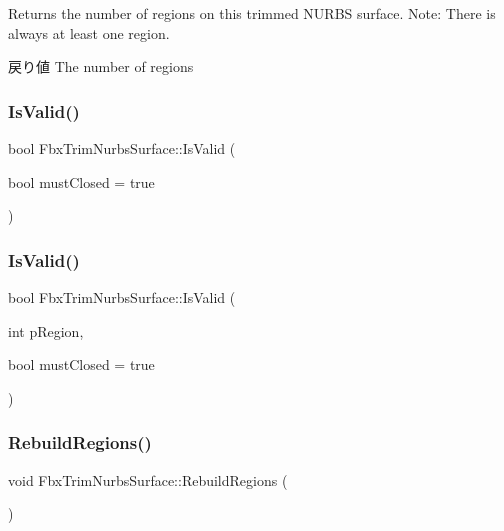Returns the number of regions on this trimmed N\+U\+R\+BS surface. Note\+: There is always at least one region. \begin{DoxyReturn}{戻り値}
The number of regions 
\end{DoxyReturn}
\mbox{\label{class_fbx_trim_nurbs_surface_abf1cabd0b59cd6eefb780b1ae29635b4}} 
\subsubsection{\texorpdfstring{Is\+Valid()}{IsValid()}\hspace{0.1cm}{\footnotesize\ttfamily [1/2]}}
{\footnotesize\ttfamily bool Fbx\+Trim\+Nurbs\+Surface\+::\+Is\+Valid (\begin{DoxyParamCaption}\item[{bool}]{must\+Closed = {\ttfamily true} }\end{DoxyParamCaption})}

\mbox{\label{class_fbx_trim_nurbs_surface_aef8d884e0cf1369ea7dc01e2782f7571}} 
\subsubsection{\texorpdfstring{Is\+Valid()}{IsValid()}\hspace{0.1cm}{\footnotesize\ttfamily [2/2]}}
{\footnotesize\ttfamily bool Fbx\+Trim\+Nurbs\+Surface\+::\+Is\+Valid (\begin{DoxyParamCaption}\item[{int}]{p\+Region,  }\item[{bool}]{must\+Closed = {\ttfamily true} }\end{DoxyParamCaption})}

\mbox{\label{class_fbx_trim_nurbs_surface_ac233fb1ab17ead3b67615553b4b02165}} 
\subsubsection{\texorpdfstring{Rebuild\+Regions()}{RebuildRegions()}}
{\footnotesize\ttfamily void Fbx\+Trim\+Nurbs\+Surface\+::\+Rebuild\+Regions (\begin{DoxyParamCaption}{ }\end{DoxyParamCaption})}

